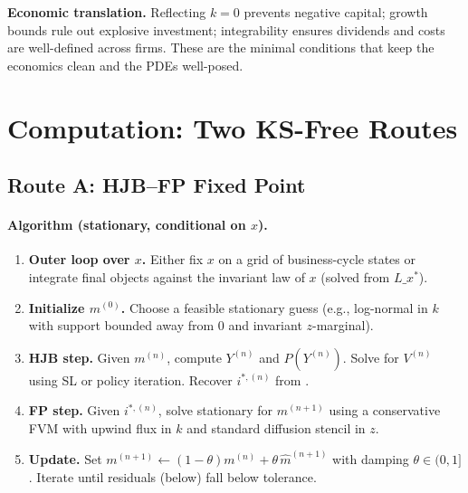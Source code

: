 ﻿\documentclass[11pt,letterpaper,oneside]{article}
\numberwithin{equation}{section}
\newcommand{\ac}[1]{{\mdseries\textsc{#1}}}
\newcommand{\1}{\mathbf{1}}
\newcommand{\Lx}{L\_x}
\begin{document}
\begin{tcolorbox}[didacticstyle]
\textbf{Economic translation.} Reflecting $k=0$ prevents negative capital; growth bounds rule out explosive investment; integrability ensures dividends and costs are well-defined across firms. These are the minimal conditions that keep the economics clean and the PDEs well-posed.
\end{tcolorbox}

\section{Computation: Two KS-Free Routes}

\subsection{Route A: \ac{HJB}--\ac{FP} Fixed Point}\label{sec:routeA}

\paragraph{Algorithm (stationary, conditional on $x$).}
\begin{enumerate}[leftmargin=1.5em,label=\textbf{A.\arabic*}]
\item \textbf{Outer loop over $x$.} Either fix $x$ on a grid of business-cycle states or integrate final objects against the invariant law of $x$ (solved from $\Lx^\ast$).
\item \textbf{Initialize $m^{(0)}$.} Choose a feasible stationary guess (e.g., log-normal in $k$ with support bounded away from $0$ and invariant $z$-marginal).
\item \textbf{HJB step.} Given $m^{(n)}$, compute $Y^{(n)}$ and $P(Y^{(n)})$. Solve  for $V^{(n)}$ using \ac{SL} or policy iteration. Recover $i^{*,(n)}$ from .
\item \textbf{FP step.} Given $i^{*,(n)}$, solve stationary  for $m^{(n+1)}$ using a conservative \ac{FVM} with upwind flux in $k$ and standard diffusion stencil in $z$.
\item \textbf{Update.} Set $m^{(n+1)}\leftarrow (1-\theta)m^{(n)}+\theta\,\widehat m^{(n+1)}$ with damping $\theta\in(0,1]$. Iterate until residuals (below) fall below tolerance.
\end{enumerate}
\end{document}

